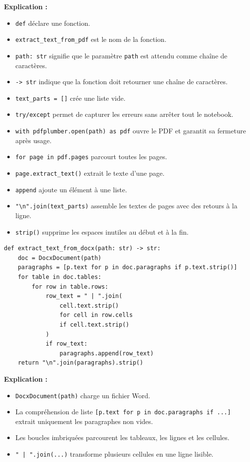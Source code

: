 \documentclass[12pt,a4paper]{article}
\begin{document}
\textbf{Explication :}
\begin{itemize}
  \item \texttt{def} déclare une fonction.
  \item \texttt{extract\_text\_from\_pdf} est le nom de la fonction.
  \item \texttt{path: str} signifie que le paramètre \texttt{path} est attendu comme chaîne de caractères.
  \item \texttt{-> str} indique que la fonction doit retourner une chaîne de caractères.
  \item \texttt{text\_parts = []} crée une liste vide.
  \item \texttt{try/except} permet de capturer les erreurs sans arrêter tout le notebook.
  \item \texttt{with pdfplumber.open(path) as pdf} ouvre le PDF et garantit sa fermeture après usage.
  \item \texttt{for page in pdf.pages} parcourt toutes les pages.
  \item \texttt{page.extract\_text()} extrait le texte d'une page.
  \item \texttt{append} ajoute un élément à une liste.
  \item \texttt{"\textbackslash n".join(text\_parts)} assemble les textes de pages avec des retours à la ligne.
  \item \texttt{strip()} supprime les espaces inutiles au début et à la fin.
\end{itemize}

\begin{lstlisting}[style=pythonstyle]
def extract_text_from_docx(path: str) -> str:
    doc = DocxDocument(path)
    paragraphs = [p.text for p in doc.paragraphs if p.text.strip()]
    for table in doc.tables:
        for row in table.rows:
            row_text = " | ".join(
                cell.text.strip()
                for cell in row.cells
                if cell.text.strip()
            )
            if row_text:
                paragraphs.append(row_text)
    return "\n".join(paragraphs).strip()
\end{lstlisting}

\textbf{Explication :}
\begin{itemize}
  \item \texttt{DocxDocument(path)} charge un fichier Word.
  \item La compréhension de liste \texttt{[p.text for p in doc.paragraphs if ...]} extrait uniquement les paragraphes non vides.
  \item Les boucles imbriquées parcourent les tableaux, les lignes et les cellules.
  \item \texttt{" | ".join(...)} transforme plusieurs cellules en une ligne lisible.
\end{itemize}
\end{document}
